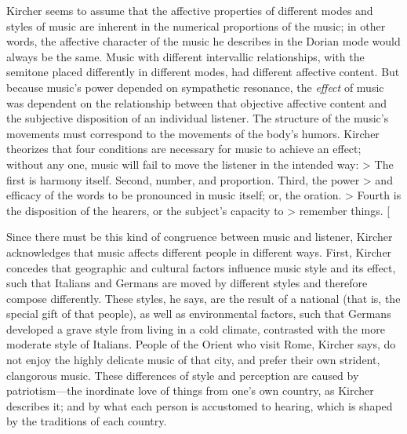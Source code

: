 Kircher seems to assume that the affective properties of different modes and styles of music are inherent in the numerical proportions of the music; in other words, the affective character of the music he describes in the Dorian mode would always be the same.
Music with different intervallic relationships, with the semitone placed differently in different modes, had different affective content.
But because music's power depended on sympathetic resonance, the \emph{effect} of music was dependent on the relationship between that objective affective content and the subjective disposition of an individual listener.
The structure of the music's movements must correspond to the movements of the body's humors.
Kircher theorizes that four conditions are necessary for music to achieve an effect; without any one, music will fail to move the listener in the intended way:
> The first is harmony itself. Second, number, and proportion. Third, the power > and efficacy of the words to be pronounced in music itself; or, the oration.
> Fourth is the disposition of the hearers, or the subject's capacity to > remember things.
[\Autocite[550:  .]{Kircher:Musurgia}

Since there must be this kind of congruence between music and listener, Kircher acknowledges that music affects different people in different ways.
First, Kircher concedes that geographic and cultural factors influence music style and its effect, such that Italians and Germans are moved by different styles and therefore compose differently.
These styles, he says, are the result of a national  (that is, the special gift of that people), as well as environmental factors, such that Germans developed a grave style from living in a cold climate, contrasted with the more moderate style of Italians.
People of the Orient who visit Rome, Kircher says, do not enjoy the highly delicate music of that city, and prefer their own strident, clangorous music.
These differences of style and perception are caused by patriotism---the inordinate love of things from one's own country, as Kircher describes it; and by what each person is accustomed to hearing, which is shaped by the traditions of each country.
\Autocites[543--544]{Kircher:Musurgia}[see partial translation in][707--711]{Strunk:SRMH}

